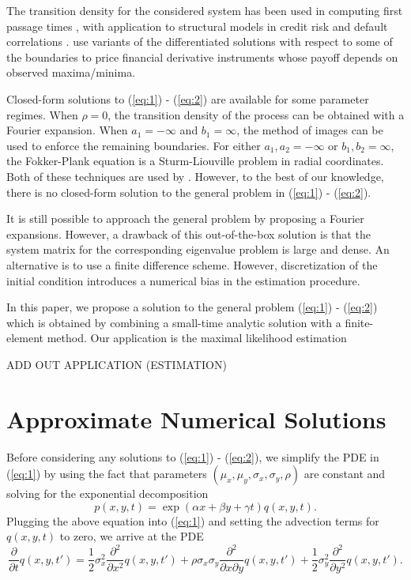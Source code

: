 \documentclass[10pt]{article}
\begin{document}
The transition density for the considered system has been used in
computing first passage times \citep{kou2016first,
  sacerdote2016first}, with application to structural models in credit
risk and default correlations \citep{haworth2008modelling,
  ching2014correlated}. \citep{he1998double} use variants of the
differentiated solutions with respect to some of the boundaries to
price financial derivative instruments whose payoff depends on
observed maxima/minima. 

Closed-form solutions to (\ref{eq:1}) - (\ref{eq:2}) are available for
some parameter regimes. When $\rho = 0$, the transition density of the
process can be obtained with a Fourier expansion. When $a_1 = -\infty$
and $b_1 = \infty$, the method of images can be used to enforce the
remaining boundaries. For either $a_1, a_2 = -\infty$ or
$b_1, b_2 = \infty$, the Fokker-Plank equation is a Sturm-Liouville
problem in radial coordinates. Both of these techniques are used by
\cite{he1998double}. However, to the best of our knowledge, there is
no closed-form solution to the general problem in (\ref{eq:1}) -
(\ref{eq:2}).

It is still possible to approach the general problem by proposing a
Fourier expansions. However, a drawback of this out-of-the-box
solution is that the system matrix for the corresponding eigenvalue
problem is large and dense. An alternative is to use a finite
difference scheme. However, discretization of the initial condition
introduces a numerical bias in the estimation procedure.

In this paper, we propose a solution to the general problem
(\ref{eq:1}) - (\ref{eq:2}) which is obtained by combining a
small-time analytic solution with a finite-element method. Our
application is the maximal likelihood estimation

ADD OUT APPLICATION (ESTIMATION)

\section{Approximate Numerical Solutions}
Before considering any solutions to (\ref{eq:1}) - (\ref{eq:2}), we
simplify the PDE in (\ref{eq:1}) by using the fact that parameters
$(\mu_x, \mu_y, \sigma_x, \sigma_y, \rho)$ are constant and solving
for the exponential decomposition
\[
  p(x,y,t) = \exp(\alpha x + \beta y + \gamma t) q(x,y,t).
\]
Plugging the above equation into (\ref{eq:1}) and setting the
advection terms for $q(x,y,t)$ to zero, we arrive at the PDE
\[
  \frac{\partial}{\partial t} q(x,y,t') = \frac{1}{2}\sigma_x^2
  \frac{\partial^2}{\partial x^2}q(x,y,t') + \rho\sigma_x\sigma_y
  \frac{\partial^2}{\partial x \partial y}q(x,y,t') +
  \frac{1}{2}\sigma_y^2 \frac{\partial^2}{\partial y^2}q(x,y,t').
\]
\end{document}
